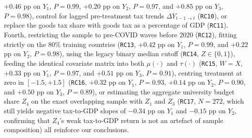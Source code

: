 \documentclass[11pt,a4paper]{article}
\begin{document}
$+0.46$ pp on $Y_1$, $P = 0.99$, $+0.20$ pp on $Y_2$, $P = 0.97$, and $+0.85$ pp on $Y_3$, $P = 0.98$), control for lagged pre-treatment tax trends $\Delta Y_{t-1\to t}$ (\texttt{RC10}), or replace the goods tax share with goods tax as a percentage of GDP (\texttt{RC11}). Fourth, restricting the sample to pre-COVID waves before 2020 (\texttt{RC12}), fitting strictly on the 80\% training countries (\texttt{RC13}, $+0.42$ pp on $Y_1$, $P = 0.99$, and $+0.22$ pp on $Y_2$, $P = 0.98$), using the legacy binary median cutoff (\texttt{RC14}, $Z \in \{0, 1\}$), feeding the identical covariate matrix into both $\mu(\cdot)$ and $\tau(\cdot)$ (\texttt{RC15}, $W = X$, $+0.33$ pp on $Y_1$, $P = 0.97$, and $+0.51$ pp on $Y_3$, $P = 0.91$), centring treatment at zero in $[-1.5, +1.5]$ (\texttt{RC16}, $+0.32$ pp on $Y_1$, $P = 0.93$, $+0.14$ pp on $Y_2$, $P = 0.90$, and $+0.50$ pp on $Y_3$, $P = 0.89$), or estimating the aggregate university budget share $Z_4$ on the exact overlapping sample with $Z_1$ and $Z_3$ (\texttt{RC17}, $N = 272$, which still yields negative tax-to-GDP slopes of $-0.34$ pp on $Y_1$ and $-0.15$ pp on $Y_2$, confirming that $Z_4$'s weak tax-to-GDP return is not an artefact of sample composition) all reinforce our conclusions.
\end{document}
